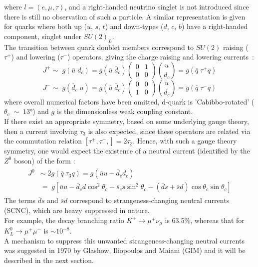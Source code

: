 where $ l= (e,\mu,\tau)$, and a right-handed neutrino singlet is not introduced since there is still no observation of such a particle. A similar representation is given for
quarks where both up ($u$, $s$, $t$) and down-types ($d$, $c$, $b$) have a right-handed component, singlet under $SU(2)_L$.
\vspace{\baselineskip}
\\The transition between quark doublet members correspond to $SU(2)$ raising ($\tau^+$) and lowering ($\tau^-$) operators, giving the charge raising and lowering currents~\cite{renton}:
\begin{equation*}
J^{+} \sim \; g(\bar{u} \; d_{c}) = g(\bar{u} \; \bar{d}_{c})\left(\begin{array}{cc}  
																								0 & 1 \\ 
																								0 & 0
																								\end{array} \right)  \binom{u}{d_c} = g (\bar{q} \; \tau^{+}q)  
\end{equation*}
\begin{equation}
J^{-} \sim \; g(\bar{d}_c \; u) = g(\bar{u} \; \bar{d}_{c})\left(\begin{array}{cc}  
																								0 & 0 \\ 
																								1 & 0
																								\end{array} \right)  \binom{u}{d_c} = g (\bar{q} \; \tau^{-}q)  
\end{equation}
where overall numerical factors have been omitted, d-quark is 'Cabibbo-rotated' ($\theta_c\;\sim\; 13\si{\degree}$) and  $g$ is the dimensionless weak coupling constant.\\
If there exist an appropriate symmetry, based on some underlying gauge theory, then a current involving $\tau_3$ is also expected, since these operators are related via 
the commutation relation $\left[  \tau^{+}, \tau^{-}, \right] = 2\tau_3$. Hence, with such a gauge theory symmetry, one would expect the existence of a neutral current
(identified by the $Z^0$ boson) of the form :
\begin {align}
	\begin{split}
		J^{0} & \sim \; 2g (\bar{q} \; \tau_{3}q)  = g(\bar{u} u- \bar{d}_{c} d_{c}) \\
				& = \; g[ \bar{u} u- \bar{d}_{c} d \cos^{2}\theta_{c}  - \bar{s}_{c} s \sin^{2}\theta_{c} - (\bar{d} s + \bar{s} d) \cos\theta_{c}\sin\theta_{c}  ]
	\end{split}						
\end{align}
The terms $\bar{d} s$ and $\bar{s} d$ correspond to strangeness-changing neutral currents (SCNC), which are heavy suppressed in nature. \\
For example, the decay branching ratio $K^{+}\rightarrow \mu^{+} \nu_{\mu}$ is 63.5\%, whereas that for \\$K^{0}_{L}\rightarrow \mu^{+} \mu^{-}$ is $\sim 10^{-8}$.\\
A mechanism to suppress this unwanted strangeness-changing neutral currents was suggested in 1970 by Glashow, Iliopoulos and Maiani (GIM) and it will be described in the next section.

